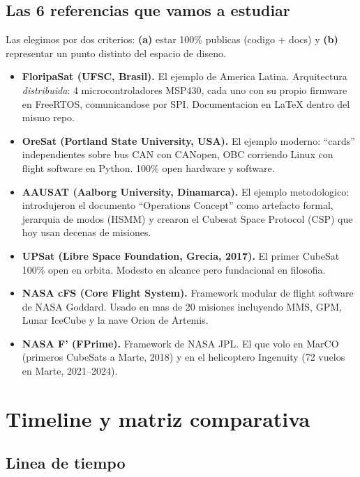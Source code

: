 \documentclass[11pt,a4paper,oneside,openright]{book}
\begin{document}
\section{Las 6 referencias que vamos a estudiar}

Las elegimos por dos criterios: \textbf{(a)} estar 100\% publicas (codigo
+ docs) y \textbf{(b)} representar un punto distinto del espacio de
diseno.

\begin{itemize}[leftmargin=2em]
  \item \textbf{FloripaSat (UFSC, Brasil).} El ejemplo de America Latina.
    Arquitectura \emph{distribuida}: 4 microcontroladores MSP430,
    cada uno con su propio firmware en FreeRTOS, comunicandose por SPI.
    Documentacion en LaTeX dentro del mismo repo.
  \item \textbf{OreSat (Portland State University, USA).} El ejemplo
    moderno: ``cards'' independientes sobre bus CAN con CANopen, OBC
    corriendo Linux con flight software en Python. 100\% open hardware
    y software.
  \item \textbf{AAUSAT (Aalborg University, Dinamarca).} El ejemplo
    metodologico: introdujeron el documento ``Operations Concept''
    como artefacto formal, jerarquia de modos (HSMM) y crearon el
    Cubesat Space Protocol (CSP) que hoy usan decenas de misiones.
  \item \textbf{UPSat (Libre Space Foundation, Grecia, 2017).} El
    primer CubeSat 100\% open en orbita. Modesto en alcance pero
    fundacional en filosofia.
  \item \textbf{NASA cFS (Core Flight System).} Framework modular de
    flight software de NASA Goddard. Usado en mas de 20 misiones
    incluyendo MMS, GPM, Lunar IceCube y la nave Orion de Artemis.
  \item \textbf{NASA F' (FPrime).} Framework de NASA JPL. El que volo
    en MarCO (primeros CubeSats a Marte, 2018) y en el helicoptero
    Ingenuity (72 vuelos en Marte, 2021--2024).
\end{itemize}

\chapter{Timeline y matriz comparativa}

\section{Linea de tiempo}
\end{document}
